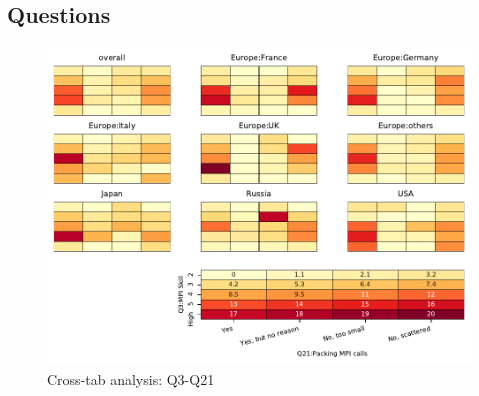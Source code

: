 
\subsection{Questions}


\begin{figure}
\begin{center}
\includegraphics[width=12cm]{../pdfs/Q3-Q21.pdf}
\caption{Cross-tab analysis: Q3-Q21}
\label{fig:Q3-Q21}
\end{center}
\end{figure}
